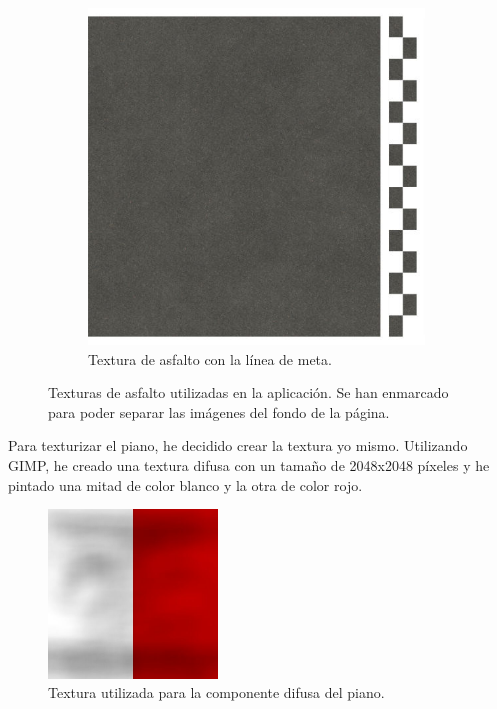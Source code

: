 \begin{figure}[H]
	\begin{subfigure}[t]{0.48\textwidth}
	    \centering
	    \includegraphics[width=0.98\textwidth,cframe=black 0.5pt 0pt]{imagenes/converted/pista/Asphalt024A_2K_Color_FinishLineFinal.jpg}
        \caption{Textura de asfalto con la línea de meta.}
    \end{subfigure}    
    \caption{Texturas de asfalto utilizadas en la aplicación. Se han enmarcado para poder separar las imágenes del fondo de la página.}
    \label{fig:asfaltoTextura}
\end{figure}

Para texturizar el piano, he decidido crear la textura yo mismo. Utilizando GIMP, he creado una textura difusa con un tamaño de 2048x2048 píxeles y he pintado una mitad de color blanco y la otra de color rojo. 


\begin{figure}[H]
    \centering
    \includegraphics[width=0.4\textwidth]{imagenes/converted/pista/kerb-dirty2.jpg}
    \caption{Textura utilizada para la componente difusa del piano.}
    \label{fig:pianodiff}
\end{figure}


